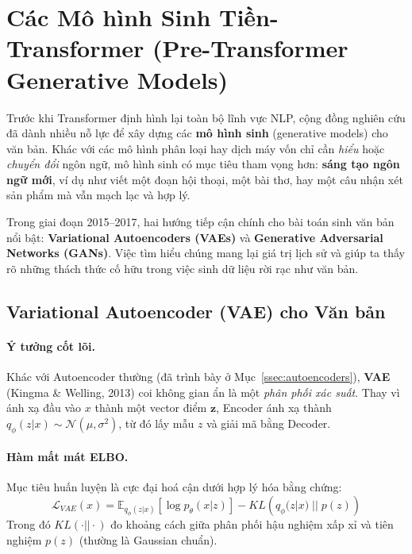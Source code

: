 
\section{Các Mô hình Sinh Tiền-Transformer (Pre-Transformer Generative Models)}
\label{sec:pre_transformer_generative}

Trước khi Transformer định hình lại toàn bộ lĩnh vực NLP, cộng đồng nghiên cứu đã dành nhiều nỗ lực để xây dựng các \textbf{mô hình sinh} (generative models) cho văn bản. Khác với các mô hình phân loại hay dịch máy vốn chỉ cần \textit{hiểu} hoặc \textit{chuyển đổi} ngôn ngữ, mô hình sinh có mục tiêu tham vọng hơn: \textbf{sáng tạo ngôn ngữ mới}, ví dụ như viết một đoạn hội thoại, một bài thơ, hay một câu nhận xét sản phẩm mà vẫn mạch lạc và hợp lý.

Trong giai đoạn 2015–2017, hai hướng tiếp cận chính cho bài toán sinh văn bản nổi bật: \textbf{Variational Autoencoders (VAEs)} và \textbf{Generative Adversarial Networks (GANs)}. Việc tìm hiểu chúng mang lại giá trị lịch sử và giúp ta thấy rõ những thách thức cố hữu trong việc sinh dữ liệu rời rạc như văn bản.

\subsection{Variational Autoencoder (VAE) cho Văn bản}
\label{ssec:vae_for_text}

\paragraph{Ý tưởng cốt lõi.}  
Khác với Autoencoder thường (đã trình bày ở Mục~\ref{ssec:autoencoders}), \textbf{VAE} (Kingma \& Welling, 2013) \cite{kingma2013auto} coi không gian ẩn là một \textit{phân phối xác suất}. Thay vì ánh xạ đầu vào $x$ thành một vector điểm $\mathbf{z}$, Encoder ánh xạ thành $q_\phi(z|x) \sim \mathcal{N}(\mu, \sigma^2)$, từ đó lấy mẫu $z$ và giải mã bằng Decoder.

\paragraph{Hàm mất mát ELBO.}  
Mục tiêu huấn luyện là cực đại hoá cận dưới hợp lý hóa bằng chứng:
\[
\mathcal{L}_{VAE}(x) = \mathbb{E}_{q_\phi(z|x)} \left[ \log p_\theta(x|z) \right] - KL\left(q_\phi(z|x)\;||\;p(z)\right)
\]
Trong đó $KL(\cdot||\cdot)$ đo khoảng cách giữa phân phối hậu nghiệm xấp xỉ và tiên nghiệm $p(z)$ (thường là Gaussian chuẩn).

